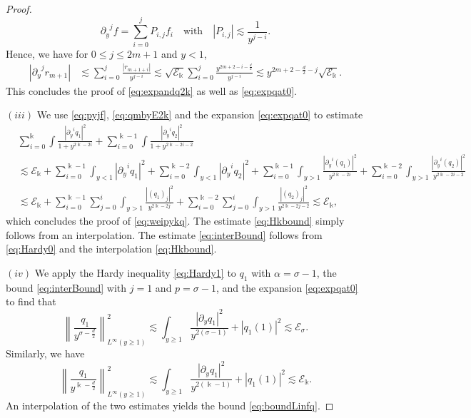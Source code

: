 \documentclass[11pt]{aims}
\theoremstyle{definition}
\numberwithin{equation}{section}
\begin{document}
\begin{proof}
\begin{equation}\label{eq:pyjf}
{\partial_y}^j f = \sum_{i = 0}^j P_{i,j}f_i \quad \text{with} \quad |P_{i,j}| \lesssim \frac{1}{y^{j - i}}.
\end{equation}
Hence, we have for $0 \leq j \leq 2m + 1$ and $y < 1$,
\begin{align*}
|{\partial_y}^j r_{m + 1}|&\lesssim \sum_{i = 0}^j \frac{|r_{m + 1 + i}|}{y^{j-i}}\lesssim \sqrt{{\mathscr{E}}_{\Bbbk}}\sum_{i = 0}^j \frac{y^{2m + 2 - i - \frac{d}{2}}}{y^{j - i}} \lesssim y^{2m + 2 -\frac{d}{2} - j}\sqrt{{\mathscr{E}}_{\Bbbk}}.
\end{align*}
This concludes the proof of \eqref{eq:expandq2k} as well as \eqref{eq:expqat0}.

$(iii)$ We use \eqref{eq:pyjf}, \eqref{eq:qmbyE2k} and the expansion \eqref{eq:expqat0} to estimate
\begin{align*}
&\sum_{i = 0}^{\Bbbk}\int \frac{|{\partial_y}^i q_1|^2}{1 + y^{2\Bbbk - 2i}} + \sum_{i = 0}^{\Bbbk - 1}\int \frac{|{\partial_y}^i q_2|^2}{1 + y^{2\Bbbk - 2i - 2}}\\
& \lesssim {\mathscr{E}}_{\Bbbk} + \sum_{i = 0}^{\Bbbk - 1} \int_{y < 1} |{\partial_y}^i q_1|^2 +  \sum_{i = 0}^{\Bbbk - 2} \int_{y < 1} |{\partial_y}^i q_2|^2  + \sum_{i = 0}^{\Bbbk - 1}\int_{y > 1}\frac{|{\partial_y}^i(q_1)|^2}{y^{2\Bbbk - 2i}} +\sum_{i = 0}^{\Bbbk - 2}\int_{y > 1}\frac{|{\partial_y}^i(q_2)|^2}{y^{2\Bbbk - 2i - 2}}\\
&\lesssim {\mathscr{E}}_{\Bbbk} + \sum_{i = 0}^{\Bbbk - 1} \sum_{j = 0}^i \int_{y > 1}\frac{|(q_1)_j|^2}{y^{2\Bbbk - 2j}} + \sum_{i = 0}^{\Bbbk - 2} \sum_{j = 0}^i \int_{y > 1}\frac{|(q_2)_j|^2}{y^{2\Bbbk - 2j - 2}} \lesssim {\mathscr{E}}_{\Bbbk}, 
\end{align*}
which concludes the proof of \eqref{eq:weipykq}. The estimate \eqref{eq:Hkbound} simply follows from an interpolation. The estimate \eqref{eq:interBound} follows from \eqref{eq:Hardy0} and the interpolation \eqref{eq:Hkbound}. 

$(iv)$ We apply the Hardy inequality \eqref{eq:Hardy1} to $q_1$ with $\alpha = \sigma - 1$, the bound \eqref{eq:interBound} with $j = 1$ and $p  = \sigma  -1$, and the expansion \eqref{eq:expqat0} to find that 
$$\left\|\frac{q_1}{y^{\sigma - \frac{d}{2}}} \right\|^2_{L^\infty(y \geq 1)} \lesssim \int_{y \geq 1}\frac{|{\partial_y} q_1|^2}{y^{2(\sigma - 1)}} + |q_1(1)|^2 \lesssim {\mathscr{E}}_\sigma.$$
Similarly, we have 
$$\left\|\frac{q_1}{y^{\Bbbk - \frac{d}{2}}} \right\|^2_{L^\infty(y \geq 1)} \lesssim \int_{y \geq 1}\frac{|{\partial_y} q_1|^2}{y^{2(\Bbbk - 1)}} + |q_1(1)|^2 \lesssim {\mathscr{E}}_\Bbbk.$$
An interpolation of the two estimates yields the bound \eqref{eq:boundLinfq}. 


\end{proof}
\end{document}
